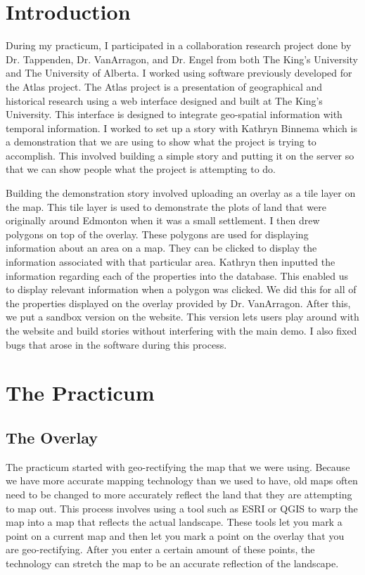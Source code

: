 \documentclass[12pt]{extarticle}
\begin{document}
\maketitle


\section{Introduction}
	During my practicum, I participated in a collaboration research project done by Dr. Tappenden, Dr. VanArragon, and Dr. Engel from both The King’s University and The University of Alberta. I worked using software previously developed for the Atlas project. The Atlas project is a presentation of geographical and historical research using a web interface designed and built at The King’s University. This interface is designed to integrate geo-spatial information with temporal information. I worked to set up a story with Kathryn Binnema which is a demonstration that we are using to show what the project is trying to accomplish. This involved building a simple story and putting it on the server so that we can show people what the project is attempting to do.

	Building the demonstration story involved uploading an overlay as a tile layer on the map. This tile layer is used to demonstrate the plots of land that were originally around Edmonton when it was a small settlement. I then drew polygons on top of the overlay. These polygons are used for displaying information about an area on a map. They can be clicked to display the information associated with that particular area. Kathryn then inputted the information regarding each of the properties into the database.  This enabled us to display relevant information when a polygon was clicked. We did this for all of the properties displayed on the overlay provided by Dr. VanArragon. After this, we put a sandbox version on the website. This version lets users play around with the website and build stories without interfering with the main demo. I also fixed bugs that arose in the software during this process.
	\clearpage

\section{The Practicum}
	\subsection{The Overlay}
		The practicum started with geo-rectifying the map that we were using.  Because we have more accurate mapping technology than we used to have, old maps often need to be changed to more accurately reflect the land that they are attempting to map out.  This process involves using a tool such as ESRI or QGIS to warp the map into a map that reflects the actual landscape.  These tools let you mark a point on a current map and then let you mark a point on the overlay that you are geo-rectifying.  After you enter a certain amount of these points, the technology can stretch the map to be an accurate reflection of the landscape.
\end{document}
